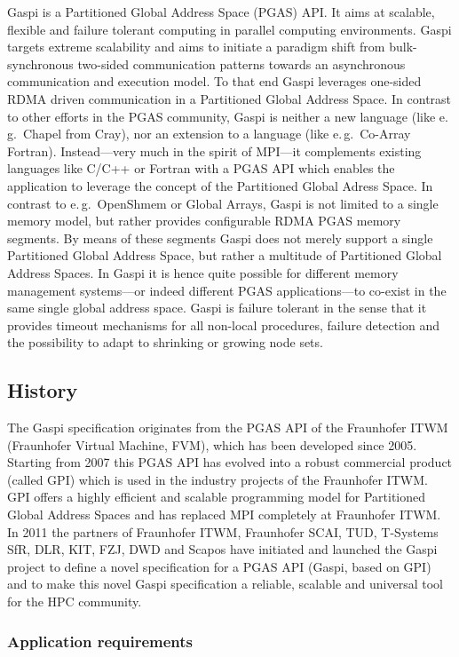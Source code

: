 \documentclass[a4paper]{article}
\newlength{\st}\setlength{\st}{0pt}
\newcommand{\GASPI}{{\sc Gaspi}}
\begin{document}
\GASPI{} is a Partitioned Global Address Space (PGAS) API. It aims at
scalable, flexible and failure tolerant computing in parallel
computing environments.  \GASPI{} targets extreme scalability and aims
to initiate a paradigm shift from bulk-synchronous two-sided
communication patterns towards an asynchronous communication and
execution model. To that end \GASPI{} leverages one-sided RDMA driven
communication in a Partitioned Global Address Space. In contrast to
other efforts in the PGAS community, \GASPI{} is neither a new
language (like e.\,g.\ Chapel from Cray), nor an extension to a
language (like e.\,g.\ Co-Array Fortran). Instead---very much in the
spirit of MPI---it complements existing languages like C/C++ or
Fortran with a PGAS API which enables the application to leverage the
concept of the Partitioned Global Adress Space.  In contrast to
e.\,g.\ OpenShmem or Global Arrays, \GASPI{} is not limited to a
single memory model, but rather provides configurable RDMA
PGAS memory segments.  By means of these segments \GASPI{} does not
merely support a single Partitioned Global Address Space, but rather a
multitude of Partitioned Global Address Spaces. In \GASPI{} it is hence
quite possible for different memory management systems---or indeed
different PGAS applications---to co-exist in the same single global
address space. \GASPI{} is failure tolerant in the sense that it
provides timeout mechanisms for all non-local procedures, failure
detection and the possibility to adapt to shrinking or growing node
sets.

\subsection{History}
The \GASPI{} specification originates from the PGAS API of the Fraunhofer
ITWM (Fraunhofer Virtual Machine, FVM), which has been developed since
2005. Starting from 2007 this PGAS API has evolved into a robust
commercial product (called GPI) which is used in the industry projects
of the Fraunhofer ITWM. GPI offers a highly efficient and scalable
programming model for Partitioned Global Address Spaces and has
replaced MPI completely at Fraunhofer ITWM. In 2011 the partners of
Fraunhofer ITWM, Fraunhofer SCAI, TUD, T-Systems SfR, DLR, KIT, FZJ,
DWD and Scapos have initiated and launched the \GASPI{} project to
define a novel specification for a PGAS API (\GASPI{}, based on GPI) and to
make this novel \GASPI{} specification a reliable, scalable and universal
tool for the HPC community.

\subsubsection{Application requirements}
\end{document}
